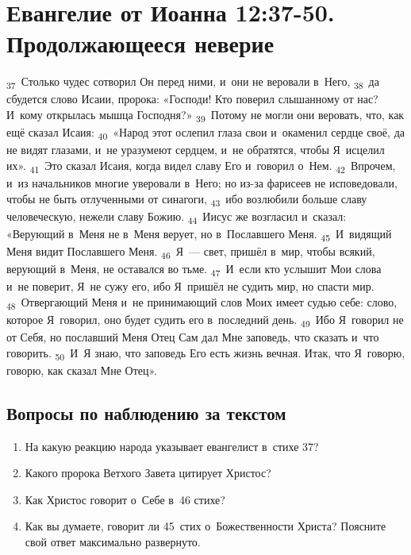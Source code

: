 \documentclass[a4paper,12pt]{article}
\begin{document}

\section{Евангелие от Иоанна 12:37-50. Продолжающееся неверие}

\textsubscript{37}~Столько чудес сотворил Он перед ними, и~они не веровали в~Него, \textsubscript{38}~да сбудется слово Исаии, пророка: «Господи! Кто поверил слышанному от нас? И~кому открылась мышца Господня?» \textsubscript{39}~Потому не могли они веровать, что, как ещё сказал Исаия: \textsubscript{40}~«Народ этот ослепил глаза свои и~окаменил сердце своё, да не видят глазами, и~не уразумеют сердцем, и~не обратятся, чтобы Я~исцелил их». \textsubscript{41}~Это сказал Исаия, когда видел славу Его и~говорил о~Нем. \textsubscript{42}~Впрочем, и~из начальников многие уверовали в~Него; но из-за фарисеев не исповедовали, чтобы не быть отлученными от синагоги, \textsubscript{43}~ибо возлюбили больше славу человеческую, нежели славу Божию. \textsubscript{44}~Иисус же возгласил и~сказал: «Верующий в~Меня не в~Меня верует, но в~Пославшего Меня. \textsubscript{45}~И~видящий Меня видит Пославшего Меня. \textsubscript{46}~Я~— свет, пришёл в~мир, чтобы всякий, верующий в~Меня, не оставался во тьме. \textsubscript{47}~И~если кто услышит Мои слова и~не поверит, Я~не сужу его, ибо Я~пришёл не судить мир, но спасти мир. \textsubscript{48}~Отвергающий Меня и~не принимающий слов Моих имеет судью себе: слово, которое Я~говорил, оно будет судить его в~последний день. \textsubscript{49}~Ибо Я~говорил не от Себя, но пославший Меня Отец Сам дал Мне заповедь, что сказать и~что говорить. \textsubscript{50}~И~Я знаю, что заповедь Его есть жизнь вечная. Итак, что Я~говорю, говорю, как сказал Мне Отец». 

\subsection*{Вопросы по наблюдению за текстом}
\begin{enumerate}
    \item На какую реакцию народа указывает евангелист в~стихе 37? 
    
    \myline
    
    \myline
    \item Какого пророка Ветхого Завета цитирует Христос? 
    
    \myline
    
    \myline
    \item Как Христос говорит о~Себе в~46 стихе? 
    
    \myline
    
    \myline
    \item Как вы думаете, говорит ли 45~стих о~Божественности Христа? Поясните свой ответ максимально развернуто. 
    
    \myline
    
    \myline
\end{enumerate}
\end{document}
